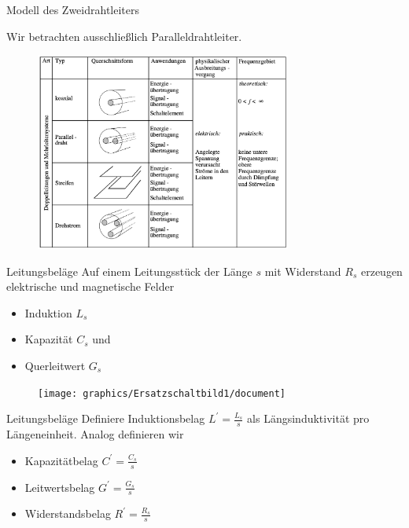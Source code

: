 \documentclass{beamer}
\begin{document}
\begin{frame}{Modell des Zweidrahtleiters}

Wir betrachten ausschließlich Paralleldrahtleiter.

\begin{figure}[!htb]
    \begin{center}
        \includegraphics[width=0.75\textwidth]{../Ausarbeitung/images/Leiter.png}
    \end{center}
\end{figure}

\end{frame}


\begin{frame}{Leitungsbeläge}
Auf einem Leitungsstück der Länge $s$ mit Widerstand $R_{s}$ erzeugen elektrische und magnetische Felder
\begin{itemize}
    \item<1-> Induktion $L_{s}$
    \item<2-> Kapazität $C_{s}$ und
    \item<3-> Querleitwert $G_{s}$
\end{itemize}
\begin{figure}[!htb]
    \begin{center}
        \texttt{[image: graphics/Ersatzschaltbild1/document]}
    \end{center}
\end{figure}
\end{frame}


\begin{frame}{Leitungsbeläge}
Definiere Induktionsbelag $L^{\prime} = \frac{L_{s}}{s}$ als Längsinduktivität pro Längeneinheit.
Analog definieren wir
\begin{itemize}
    \item Kapazitätbelag $C^{\prime} = \frac{C_{s}}{s}$
    \item Leitwertsbelag $G^{\prime} = \frac{G_{s}}{s}$
    \item Widerstandsbelag $R^{\prime} = \frac{R_{s}}{s}$
\end{itemize}

\end{frame}
\end{document}
